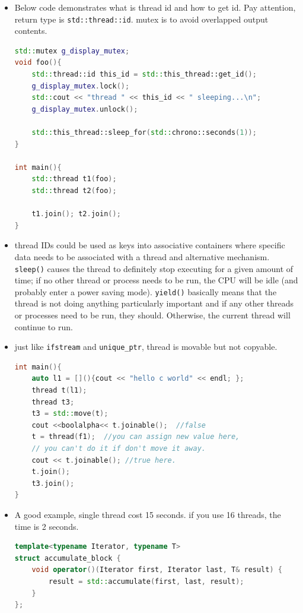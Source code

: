 \documentclass[a4paper,11pt,twoside]{book}
\begin{document}
\begin{itemize}

	\item Below code demonstrates what is thread id and how to get id. Pay attention, return type is \texttt{std::thread::id}.  mutex is to avoid overlapped output contents.
\begin{lstlisting}[frame=single, language=c++]
std::mutex g_display_mutex;
void foo(){
	std::thread::id this_id = std::this_thread::get_id();
	g_display_mutex.lock();
	std::cout << "thread " << this_id << " sleeping...\n";
	g_display_mutex.unlock();
	
	std::this_thread::sleep_for(std::chrono::seconds(1));
}

int main(){
	std::thread t1(foo);
	std::thread t2(foo);
	
	t1.join(); t2.join();
}
\end{lstlisting}		

	
	\item thread IDs could be used as keys into associative containers where specific data needs to be associated with a thread and alternative mechanism.  \texttt{sleep()} causes the thread to definitely stop executing for a given amount of time; if no other thread or process needs to be run, the CPU will be idle (and probably enter a power saving mode). \texttt{yield()} basically means that the thread is not doing anything particularly important and if any other threads or processes need to be run, they should. Otherwise, the current thread will continue to run.
	
	\item just like \texttt{ifstream} and \texttt{unique\_ptr}, thread is movable but not copyable. 
\begin{lstlisting}[frame=single, language=c++]
int main(){
	auto l1 = [](){cout << "hello c world" << endl; };
	thread t(l1);   
	thread t3;
	t3 = std::move(t);
	cout <<boolalpha<< t.joinable();  //false
	t = thread(f1);  //you can assign new value here,
	// you can't do it if don't move it away.
	cout << t.joinable(); //true here.
	t.join();
	t3.join();
}	
\end{lstlisting}	
	
	\item A good example, single thread cost 15 seconds. if you use 16 threads, the time is 2 seconds.
\begin{lstlisting}[frame=single, language=c++]
template<typename Iterator, typename T>
struct accumulate_block {
	void operator()(Iterator first, Iterator last, T& result) {
		result = std::accumulate(first, last, result);
	}
};


\end{lstlisting}
\end{itemize}
\end{document}
